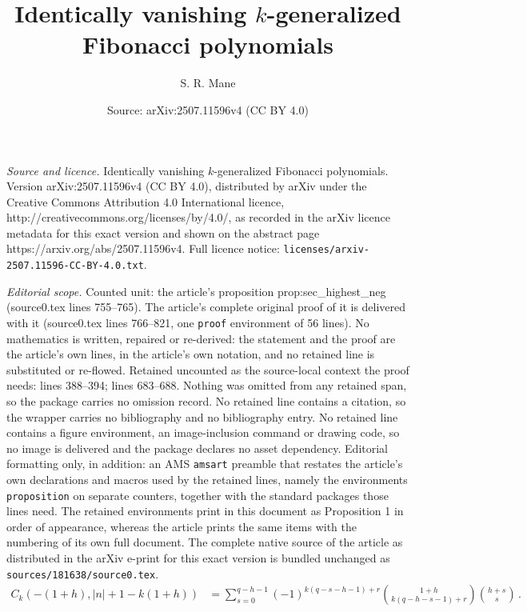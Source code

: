\documentclass[10pt,a4paper]{amsart}
\title{Identically vanishing $k$-generalized Fibonacci polynomials}
\author{S. R. Mane}
\date{Source: arXiv:2507.11596v4 (CC BY 4.0)}
\begin{document}
\maketitle

\noindent\emph{Source and licence.} Identically vanishing $k$-generalized Fibonacci polynomials. Version arXiv:2507.11596v4 (CC BY 4.0), distributed by arXiv under the Creative Commons Attribution 4.0 International licence, http://creativecommons.org/licenses/by/4.0/, as recorded in the arXiv licence metadata for this exact version and shown on the abstract page https://arxiv.org/abs/2507.11596v4. Full licence notice: \texttt{licenses/arxiv-2507.11596-CC-BY-4.0.txt}.\par\smallskip

\noindent\textit{Editorial scope.} Counted unit: the article's proposition prop:sec\_highest\_neg (source0.tex lines 755--765). The article's complete original proof of it is delivered with it (source0.tex lines 766--821, one \texttt{proof} environment of 56 lines). No mathematics is written, repaired or re-derived: the statement and the proof are the article's own lines, in the article's own notation, and no retained line is substituted or re-flowed.  Retained uncounted as the source-local context the proof needs: lines 388--394; lines 683--688.  Nothing was omitted from any retained span, so the package carries no omission record.  No retained line contains a citation, so the wrapper carries no bibliography and no bibliography entry.  No retained line contains a figure environment, an image-inclusion command or drawing code, so no image is delivered and the package declares no asset dependency.  Editorial formatting only, in addition: an AMS \texttt{amsart} preamble that restates the article's own declarations and macros used by the retained lines, namely the environments \texttt{proposition} on separate counters, together with the standard packages those lines need.  The retained environments print in this document as Proposition 1 in order of appearance, whereas the article prints the same items with the numbering of its own full document.  The complete native source of the article as distributed in the arXiv e-print for this exact version is bundled unchanged as \texttt{sources/181638/source0.tex}.
\begin{equation}
\label{eq:Cnk_neg_qr}    
\begin{split}
  C_k(-(1+h),|n|+1-k(1+h)) &= \sum_{s=0}^{q-h-1} (-1)^{k(q-s-h-1)+r} 
  \binom{1+h}{k(q-h-s-1)+r} \binom{h+s}{s} \,.
\end{split}
\end{equation}
\end{document}
